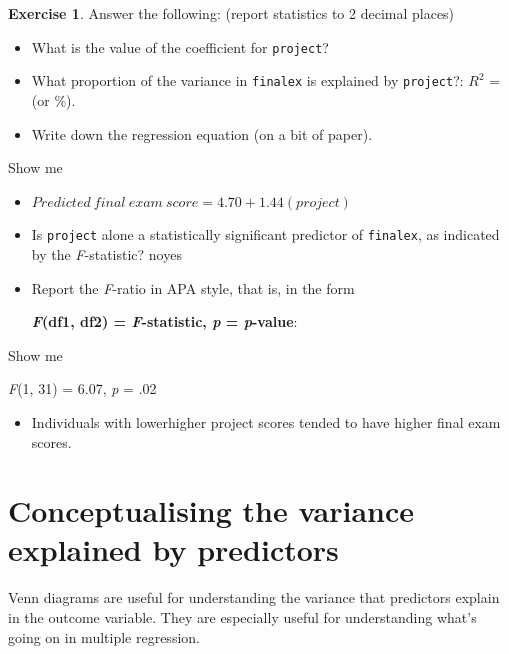 \documentclass[
]{book}
\providecommand{\tightlist}{%
  \setlength{\itemsep}{0pt}\setlength{\parskip}{0pt}}
\theoremstyle{definition}
\theoremstyle{definition}
\theoremstyle{definition}
\newtheorem{exercise}{Exercise}[chapter]
\theoremstyle{definition}
\theoremstyle{remark}
\begin{document}
\begin{exercise}
\hfill\break
Answer the following: (report statistics to 2 decimal places)

\begin{itemize}
\item
  What is the value of the coefficient for \texttt{project}?
\item
  What proportion of the variance in \texttt{finalex} is explained by \texttt{project}?: \(R^2\) = (or \%).
\item
  Write down the regression equation (on a bit of paper).
\end{itemize}

Show me

\begin{itemize}
\tightlist
\item
  \(Predicted\ final\ exam\ score = 4.70 + 1.44(project)\)
\end{itemize}

\begin{itemize}
\item
  Is \texttt{project} alone a statistically significant predictor of \texttt{finalex}, as indicated by the \emph{F}-statistic? noyes
\item
  Report the \emph{F}-ratio in APA style, that is, in the form

  \textbf{\emph{F}(df1, df2) = \emph{F}-statistic, \emph{p} = \emph{p}-value}:
\end{itemize}

Show me

\emph{F}(1, 31) = 6.07, \emph{p} = .02

\begin{itemize}
\tightlist
\item
  Individuals with lowerhigher project scores tended to have higher final exam scores.
\end{itemize}

\end{exercise}

\hypertarget{conceptualising-the-variance-explained-by-predictors}{%
\section{Conceptualising the variance explained by predictors}\label{conceptualising-the-variance-explained-by-predictors}}

Venn diagrams are useful for understanding the variance that predictors explain in the outcome variable. They are especially useful for understanding what's going on in multiple regression.
\end{document}
